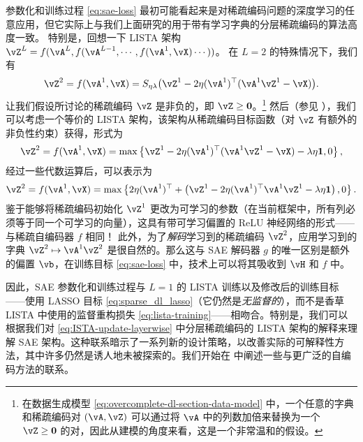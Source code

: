 \documentclass[../../book-main.tex]{subfiles}
\begin{document}
参数化和训练过程 \eqref{eq:sae-loss} 最初可能看起来是对稀疏编码问题的深度学习的任意应用，但它实际上与我们上面研究的用于带有学习字典的分层稀疏编码的算法高度一致。
特别是，回想一下 LISTA %
架构 $\vZ^{L} = f(\vA^L, f(\vA^{L-1}, \cdots, f(\vA^1, \vX) \cdots ))$。
在 $L=2$ 的特殊情况下，我们有
\begin{equation}
    \vZ^2 = f(\vA^1, \vX) 
    =S_{\eta\lambda}\rp{\vZ^{1} - 2\eta(\vA^{1})^{\top}(\vA^1\vZ^{1} - \vX)}.
\end{equation}
让我们假设所讨论的稀疏编码 $\vZ$ 是非负的，即 $\vZ \geq \Zero$。\footnote{在数据生成模型 \eqref{eq:overcomplete-dl-section-data-model} 中，一个任意的字典和稀疏编码对 $(\vA, \vZ)$ 可以通过将 $\vA$ 中的列数加倍来替换为一个 $\vZ \geq \Zero$ 的对，因此从建模的角度来看，这是一个非常温和的假设。}
然后（参见 ），我们可以考虑一个等价的 LISTA 架构，该架构从稀疏编码目标函数（对 $\vZ$ 有额外的非负性约束）获得，形式为
\begin{equation}
    \vZ^2 = f(\vA^1, \vX) 
    =\max \set*{\vZ^{1} - 2\eta(\vA^{1})^{\top}(\vA^1\vZ^{1} - \vX)
    - \lambda\eta \mathbf{1}, 0},
\end{equation}
经过一些代数运算后，可以表示为
\begin{equation}
    \vZ^2 = f(\vA^1, \vX) 
    =\max \set*{
        2\eta(\vA^{1})^{\top}
        +
        \left(
        \vZ^{1} - 2\eta(\vA^{1})^{\top}\vA^1\vZ^{1} - \lambda\eta \mathbf{1}
        \right), 0
    }.
\end{equation}
鉴于能够将稀疏编码初始化 $\vZ^1$ 更改为可学习的参数（在当前框架中，所有列必须等于同一个可学习的向量），这具有带可学习偏置的 ReLU 神经网络的形式——与稀疏自编码器 $f$ 相同！
此外，为了\textit{解码}学习到的稀疏编码 $\vZ^2$，应用学习到的字典 $\vZ^2 \mapsto \vA^1 \vZ^2$ 是很自然的。那么这与 SAE 解码器 $g$ 的唯一区别是额外的偏置 $\vb$，在训练目标 \eqref{eq:sae-loss} 中，技术上可以将其吸收到 $\vH$ 和 $f$ 中。

因此，SAE 参数化和训练过程与 $L=1$ 的 LISTA 训练以及修改后的训练目标——使用 LASSO 目标 \eqref{eq:sparse_dl_lasso}（它仍然是\textit{无监督的}），而不是香草 LISTA 中使用的监督重构损失 \eqref{eq:lista-training}——相吻合。特别是，我们可以根据我们对 \eqref{eq:ISTA-update-layerwise} 中分层稀疏编码的 LISTA 架构的解释来理解 SAE 架构。这种联系暗示了一系列新的设计策略，以改善实际的可解释性方法，其中许多仍然是诱人地未被探索的。我们开始在  中阐述一些与更广泛的自编码方法的联系。
\end{document}

